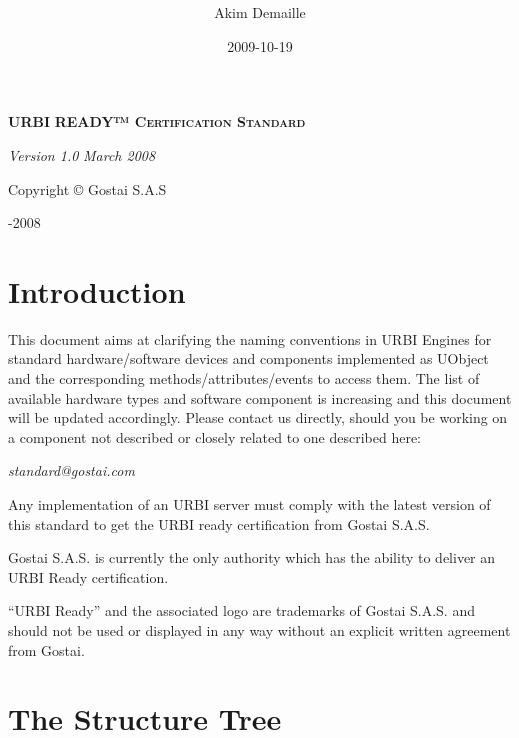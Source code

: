 \documentclass[a4paper]{article}
\title{ }
\author{Akim Demaille}
\date{2009-10-19}
\begin{document}
{\centering
\par}

{\centering
\textsf{\textbf{\textsc{URBI }}}\textsf{\textbf{\textsc{READY™
Certification Standard}}}
\par}

{\centering
\par}

{\centering
\textsf{\textit{Version 1.0}}  \textsf{\textit{March 2008}}
\par}

{\centering\sffamily
Copyright © Gostai S.A.S
\par}

{\centering{}-2008
\par}

\setcounter{tocdepth}{3}
\renewcommand\contentsname{}
\tableofcontents
\section{Introduction}

This document aims at clarifying the naming conventions
in URBI Engines for standard hardware/software devices and components
implemented as UObject and the corresponding
methods/attributes/events to access them. The list of available
hardware types and software component is increasing and this document
will be updated accordingly. Please contact us directly, should you be
working on a component not described or closely related to one
described here:

{\centering\sffamily\itshape
standard@gostai.com
\par}


Any implementation of an URBI server must comply with the latest version
of this standard to get the {\textquotedbl}URBI ready{\textquotedbl}
certification from Gostai S.A.S.


Gostai S.A.S. is currently the only authority which has the ability to
deliver an {\textquotedbl}URBI Ready{\textquotedbl} certification.

{
“URBI Ready” and the associated logo are trademarks of Gostai S.A.S. and
should not be used or displayed in any way without an explicit written
agreement from Gostai.}

\section{The Structure Tree}
\end{document}
